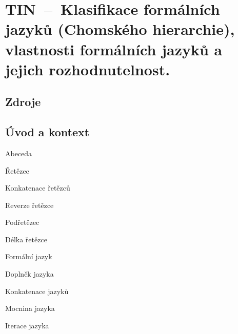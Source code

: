

\graphicspath{{tin/klasifikace_jazyku/figures}}


\chapter{TIN~--~Klasifikace formálních jazyků (Chomského hierarchie), vlastnosti formálních jazyků a jejich rozhodnutelnost.}



\section{Zdroje}

\begin{compactitem}
    \item {}
    \item {}
    \item {}
\end{compactitem}


\section{Úvod a kontext}

\begin{compactitem}
    \item Abeceda
    \item Řetězec
    \item Konkatenace řetězců
    \item Reverze řetězce
    \item Podřetězec
    \item Délka řetězce
    \item Formální jazyk
    \item Doplněk jazyka
    \item Konkatenace jazyků
    \item Mocnina jazyka
    \item Iterace jazyka
\end{compactitem}

